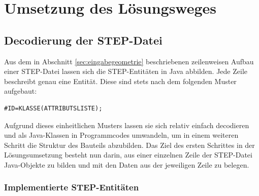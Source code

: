 \section{Umsetzung des Lösungsweges}
\label{sec:umsetzung}

\subsection{Decodierung der STEP-Datei}

Aus dem in Abschnitt \ref{sec:eingabegeometrie} beschriebenen zeilenweisen Aufbau einer STEP-Datei lassen sich die STEP-Entitäten in Java abbilden. Jede Zeile beschreibt genau eine Entität. Diese sind stets nach dem folgenden Muster aufgebaut:

\begin{lstlisting}[captionpos=b, style=customc, caption=Beschreibung eines Punktes in STEP, label=lst:simplestp]
#ID=KLASSE(ATTRIBUTSLISTE);
\end{lstlisting}

Aufgrund dieses einheitlichen Musters lassen sie sich relativ einfach decodieren und als Java-Klassen in Programmcodes umwandeln, um in einem weiteren Schritt die Struktur des Bauteils abzubilden.
Das Ziel des ersten Schrittes in der Lösungsumsetzung besteht nun darin, aus einer einzelnen Zeile der STEP-Datei Java-Objekte zu bilden und mit den Daten aus der jeweiligen Zeile zu belegen.    

\subsubsection{Implementierte STEP-Entitäten}

